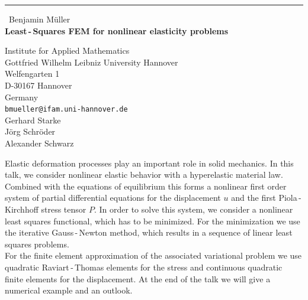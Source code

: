 \documentclass{report}
\begin{document}
\begin{center}
\rule{6in}{1pt} \
{\large Benjamin M\"uller \\
{\bf Least\,-\,Squares FEM for nonlinear elasticity problems}}

Institute for Applied Mathematics \\ Gottfried Wilhelm Leibniz University Hannover \\ Welfengarten 1 \\ D-30167 Hannover \\ Germany
\\
{\tt bmueller@ifam.uni-hannover.de}\\
Gerhard Starke \\
J\"org Schr\"oder\\
Alexander Schwarz\end{center}

Elastic deformation processes play an important role in solid mechanics.
In this talk, we consider nonlinear elastic behavior with a hyperelastic
material law. Combined with the equations of equilibrium this forms a
nonlinear first order system of partial differential equations for the
displacement $u$ and the first Piola\,-\,Kirchhoff stress tensor $P$. In
order to solve this system, we consider a nonlinear least squares
functional, which has to be minimized. For the minimization we use the
iterative Gauss\,-\,Newton method, which results in a sequence of linear
least squares problems.\\
For the finite element approximation of the associated variational
problem we use quadratic Raviart\,-\,Thomas elements for the stress and
continuous quadratic finite elements for the displacement.
At the end of the talk we will give a numerical example and an outlook.
\end{document}
